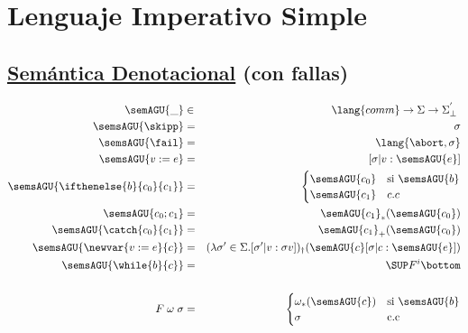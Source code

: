 \section{Lenguaje Imperativo Simple}
  \subsection*{\underline{Semántica Denotacional} (con fallas)}
      \begin{multicols}{2}
        \begin{eqnarray*}
          \semAGU{\_} &\in& \lang{comm} \rightarrow \Sigma \rightarrow \Sigma^{'}_{\bot} \\
          \semsAGU{\skipp} &=& \sigma \\
          \semsAGU{\fail} &=& \lang{\abort, \sigma} \\
          \semsAGU{v := e} &=& [\sigma | v : \semsAGU{e}] \\
          \semsAGU{\ifthenelse{b}{c_{0}}{c_{1}}} &=& \begin{cases}
                                                    \semsAGU{c_0} & \text{si } \semsAGU{b} \\
                                                    \semsAGU{c_1} & c.c \\
                                                  \end{cases}\\
          \semsAGU{c_{0};c_{1}} &=& \semAGU{c_{1}}_{\ast} (\semsAGU{c_{0}}) \\
          \semsAGU{\catch{c_{0}}{c_{1}}} &=& \semAGU{c_{1}}_{+} (\semsAGU{c_{0}}) \\
          \semsAGU{\newvar{ v:=e}{c}} &=& (\lambda \sigma' \in \Sigma. [\sigma' | v:\sigma v])_{\dag} (\semAGU{c}[\sigma|c:\semsAGU{e}]) \\
          \semsAGU{\while{b}{c}} &=& \SUP F^{i} \bottom \\ \\
          F \;\omega\;\sigma &=& \begin{cases}
                                  \omega_{\ast}(\semsAGU{c}) & \text{si } \semsAGU{b} \\
                                  \sigma & \text{c.c}
                                \end{cases}
          \end{eqnarray*}


\end{multicols}
